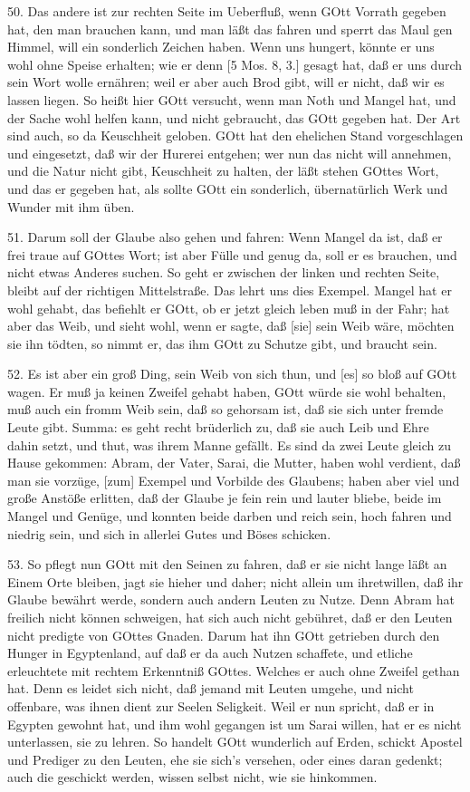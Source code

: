 50. Das andere ist zur rechten Seite im Ueberfluß, wenn GOtt Vorrath gegeben hat, den man brauchen kann, und man läßt das fahren und sperrt das Maul gen Himmel, will ein sonderlich Zeichen haben. Wenn uns hungert, könnte er uns wohl ohne Speise erhalten; wie er denn [5 Mos. 8, 3.] gesagt hat, daß er uns durch sein Wort wolle ernähren; weil er aber auch Brod gibt, will er nicht, daß wir es lassen liegen. So heißt hier GOtt versucht, wenn man Noth und Mangel hat, und der Sache wohl helfen kann, und nicht gebraucht, das GOtt gegeben hat. Der Art sind auch, so da Keuschheit geloben. GOtt hat den ehelichen Stand vorgeschlagen und eingesetzt, daß wir der Hurerei entgehen; wer nun das nicht will annehmen, und die Natur nicht gibt, Keuschheit zu halten, der läßt stehen GOttes Wort, und das er gegeben hat, als sollte GOtt ein sonderlich, übernatürlich Werk und Wunder mit ihm üben.

51. Darum soll der Glaube also gehen und fahren: Wenn Mangel da ist, daß er frei traue auf GOttes Wort; ist aber Fülle und genug da, soll er es brauchen, und nicht etwas Anderes suchen. So geht er zwischen der linken und rechten Seite, bleibt auf der richtigen Mittelstraße. Das lehrt uns dies Exempel. Mangel hat er wohl gehabt, das befiehlt er GOtt, ob er jetzt gleich leben muß in der Fahr; hat aber das Weib, und sieht wohl, wenn er sagte, daß [sie] sein Weib wäre, möchten sie ihn tödten, so nimmt er, das ihm GOtt zu Schutze gibt, und braucht sein.

52. Es ist aber ein groß Ding, sein Weib
von sich thun, und [es] so bloß auf GOtt wagen. Er muß ja keinen Zweifel gehabt haben, GOtt würde sie wohl behalten, muß auch ein fromm Weib sein, daß so gehorsam ist, daß sie sich unter fremde Leute gibt. Summa: es geht recht brüderlich zu, daß sie auch Leib und Ehre dahin setzt, und thut, was ihrem Manne gefällt. Es sind da zwei Leute gleich zu Hause gekommen: Abram, der Vater, Sarai, die Mutter, haben wohl verdient, daß man sie vorzüge, [zum] Exempel und Vorbilde des Glaubens; haben aber viel und große Anstöße erlitten, daß der Glaube je fein rein und lauter bliebe, beide im Mangel und Genüge, und konnten beide darben und reich sein, hoch fahren und niedrig sein, und sich in allerlei Gutes und Böses schicken.

53. So pflegt nun GOtt mit den Seinen zu fahren, daß er sie nicht lange läßt an Einem Orte bleiben, jagt sie hieher und daher; nicht allein um ihretwillen, daß ihr Glaube bewährt werde, sondern auch andern Leuten zu Nutze. Denn Abram hat freilich nicht können schweigen, hat sich auch nicht gebühret, daß er den Leuten nicht predigte von GOttes Gnaden. Darum hat ihn GOtt getrieben durch den Hunger in Egyptenland, auf daß er da auch Nutzen schaffete, und etliche erleuchtete mit rechtem Erkenntniß GOttes. Welches er auch ohne Zweifel gethan hat. Denn es leidet sich nicht, daß jemand mit Leuten umgehe, und nicht offenbare, was ihnen dient zur Seelen Seligkeit. Weil er nun spricht, daß er in Egypten gewohnt hat, und ihm wohl gegangen ist um Sarai willen, hat er es nicht unterlassen, sie zu lehren. So handelt GOtt wunderlich auf Erden, schickt Apostel und Prediger zu den Leuten, ehe sie sich’s versehen, oder eines daran gedenkt; auch die geschickt werden, wissen selbst nicht, wie sie hinkommen.

